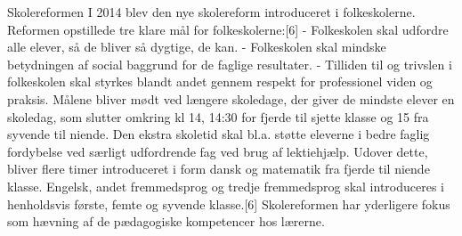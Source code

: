 Skolereformen
I 2014 blev den nye skolereform introduceret i folkeskolerne. Reformen opstillede tre klare mål for folkeskolerne:[6]
-	Folkeskolen skal udfordre alle elever, så de bliver så dygtige, de kan.
-	Folkeskolen skal mindske betydningen af social baggrund for de faglige resultater.
-	Tilliden til og trivslen i folkeskolen skal styrkes blandt andet gennem respekt for professionel viden og praksis.
Målene bliver mødt ved længere skoledage, der giver de mindste elever en skoledag, som slutter omkring kl 14, 14:30 for fjerde til sjette klasse og 15 fra syvende til niende. Den ekstra skoletid skal bl.a. støtte eleverne i bedre faglig fordybelse ved særligt udfordrende fag ved brug af lektiehjælp. Udover dette, bliver flere timer introduceret i form dansk og matematik fra fjerde til niende klasse. Engelsk, andet fremmedsprog og tredje fremmedsprog skal introduceres i henholdsvis første, femte og syvende klasse.[6]
Skolereformen har yderligere fokus som hævning af de pædagogiske kompetencer hos lærerne.
